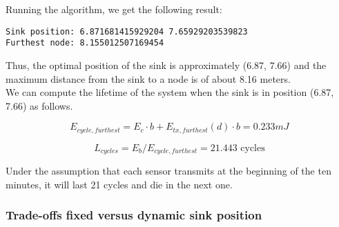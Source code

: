 Running the algorithm, we get the following result:
\begin{verbatim}
Sink position: 6.871681415929204 7.65929203539823
Furthest node: 8.155012507169454
\end{verbatim}

Thus, the optimal position of the sink is approximately (6.87, 7.66) and the maximum distance from the sink to a node is of about 8.16 meters.\\
We can compute the lifetime of the system when the sink is in position (6.87, 7.66) as follows.

\[
E_{cycle, furthest} = E_c \cdot b + E_{tx, furthest}(d) \cdot b = 0.233 mJ
\]

\[
L_{cycles} = E_b / E_{cycle, furthest} = 21.443 \text{ cycles}
\]

Under the assumption that each sensor transmits at the beginning of the ten minutes, it will last 21 cycles and die in the next one.

\subsubsection{Trade-offs fixed versus dynamic sink position}
